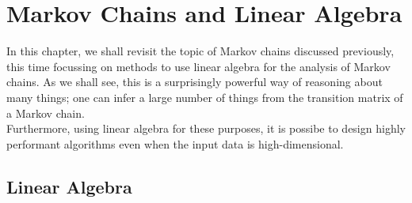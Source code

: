 \chapter{Markov Chains and Linear Algebra}

In this chapter, we shall revisit the topic of Markov chains discussed previously, this time 
focussing on methods to use linear algebra for the analysis of Markov chains. As we shall see, 
this is a surprisingly powerful way of reasoning about many things; one can infer a large number 
of things from the transition matrix of a Markov chain. \\
Furthermore, using linear algebra for these purposes, it is possibe to design highly performant 
algorithms even when the input data is high-dimensional. 

\section{Linear Algebra}
	
